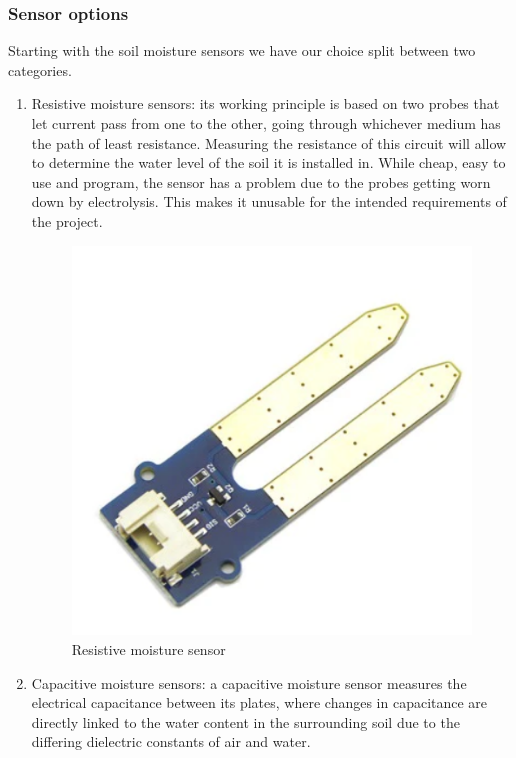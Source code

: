 \documentclass[11pt]{article}
\begin{document}
\subsubsection{Sensor options}
Starting with the soil moisture sensors we have our choice split between two categories. \newline
\begin{enumerate}
    \item Resistive moisture sensors: its working principle is based on two probes that let current pass from one to the other, going through whichever medium has the path of least resistance. Measuring the resistance of this circuit will allow to determine the water level of the soil it is installed in. While cheap, easy to use and program, the sensor has a problem due to the probes getting worn down by electrolysis. This makes it unusable for the intended requirements of the project. \newline
    \begin{figure}[ht]
        \centering
        \includegraphics[scale = 0.2]{Resistive moisture sensor.png}
        \caption{Resistive moisture sensor}
        \label{fig:Resistive sensor}
    \end{figure} \newline
    \item Capacitive moisture sensors: a capacitive moisture sensor measures the electrical capacitance between its plates, where changes in capacitance are directly linked to the water content in the surrounding soil due to the differing dielectric constants of air and water. 

\end{enumerate}
\end{document}
